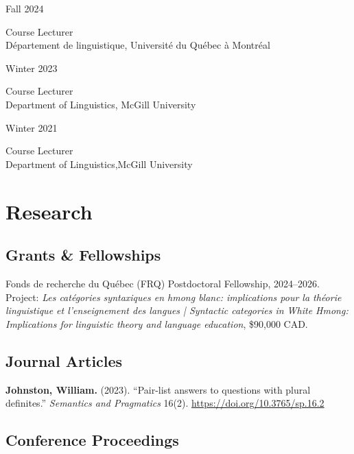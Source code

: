 \documentclass[11pt,oneside,DIV=calc,parskip=off]{scrarticle} %
\newlength{\leftcolwidth}
\newlength{\mycolspace}
\newlength{\rightcolwidth}
\newlength{\spacingbefore}
\newlength{\spacingafter}
\newcommand{\myonecol}[1]{%
	\vspace{\spacingbefore}%
	\begin{minipage}[t]{\linewidth}%
		\strut#1%
	\end{minipage}%
	\vspace{\spacingafter}\par%
	}
\newcommand{\mytwocol}[2]{%
	\vspace{\spacingbefore}%
	\begin{minipage}[t]{\leftcolwidth}%
		\strut#1%
	\end{minipage}%
	\hspace{\mycolspace}%
	\begin{minipage}[t]{\rightcolwidth}%
		\strut#2%
	\end{minipage}%
	\vspace{\spacingafter}\par%
	}
\newcommand{\pub}[1]{%
	\myonecol{#1}%
	}
\newcommand{\cvline}[2]{%
	\mytwocol{#1}{#2}%
	}
\begin{document}
\cvline{Fall 2024}{Course Lecturer\\Département de linguistique, Université du Québec à Montréal}

\cvline{Winter 2023}{Course Lecturer\\Department of Linguistics, McGill University}

\cvline{Winter 2021}{Course Lecturer\\Department of Linguistics,McGill University}


\section{Research}

\subsection{Grants \& Fellowships}

\pub{Fonds de recherche du Québec (FRQ) Postdoctoral Fellowship, 2024--2026. Project: \textit{Les catégories syntaxiques en hmong blanc: implications pour la théorie linguistique et l'enseignement des langues | Syntactic categories in White Hmong: Implications for linguistic theory and language education}, \$90,000 CAD.}

\subsection{Journal Articles}

\pub{\textbf{Johnston, William.} (2023). ``Pair-list answers to questions with plural definites.'' \textit{Semantics and Pragmatics} 16(2). \href{https://doi.org/10.3765/sp.16.2}{https://doi.org/10.3765/sp.16.2}}


\subsection{Conference Proceedings}
\end{document}
